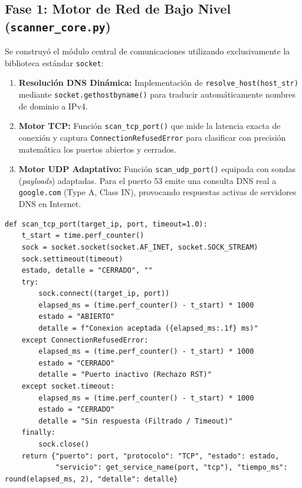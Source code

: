 \documentclass[10pt,a4paper]{article}
\newcommand{\TCP}{\textbf{TCP}}
\newcommand{\UDP}{\textbf{UDP}}
\begin{document}
\subsection{Fase 1: Motor de Red de Bajo Nivel (\texttt{scanner\_core.py})}
Se construyó el módulo central de comunicaciones utilizando exclusivamente la biblioteca estándar \texttt{socket}:
\begin{enumerate}[leftmargin=*,itemsep=1pt]
    \item \textbf{Resolución DNS Dinámica:} Implementación de \texttt{resolve\_host(host\_str)} mediante \texttt{socket.gethostbyname()} para traducir automáticamente nombres de dominio a IPv4.
    \item \textbf{Motor \TCP{}:} Función \texttt{scan\_tcp\_port()} que mide la latencia exacta de conexión y captura \texttt{ConnectionRefusedError} para clasificar con precisión matemática los puertos abiertos y cerrados.
    \item \textbf{Motor \UDP{} Adaptativo:} Función \texttt{scan\_udp\_port()} equipada con sondas (\textit{payloads}) adaptadas. Para el puerto 53 emite una consulta DNS real a \texttt{google.com} (Type A, Class IN), provocando respuestas activas de servidores DNS en Internet.
\end{enumerate}

\begin{lstlisting}[caption={Fragmento del Motor TCP implementado en \texttt{scanner\_core.py}}]
def scan_tcp_port(target_ip, port, timeout=1.0):
    t_start = time.perf_counter()
    sock = socket.socket(socket.AF_INET, socket.SOCK_STREAM)
    sock.settimeout(timeout)
    estado, detalle = "CERRADO", ""
    try:
        sock.connect((target_ip, port))
        elapsed_ms = (time.perf_counter() - t_start) * 1000
        estado = "ABIERTO"
        detalle = f"Conexion aceptada ({elapsed_ms:.1f} ms)"
    except ConnectionRefusedError:
        elapsed_ms = (time.perf_counter() - t_start) * 1000
        estado = "CERRADO"
        detalle = "Puerto inactivo (Rechazo RST)"
    except socket.timeout:
        elapsed_ms = (time.perf_counter() - t_start) * 1000
        estado = "CERRADO"
        detalle = "Sin respuesta (Filtrado / Timeout)"
    finally:
        sock.close()
    return {"puerto": port, "protocolo": "TCP", "estado": estado,
            "servicio": get_service_name(port, "tcp"), "tiempo_ms": round(elapsed_ms, 2), "detalle": detalle}
\end{lstlisting}
\end{document}
